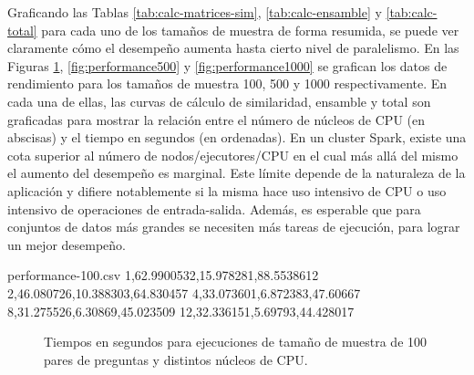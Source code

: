 Graficando las Tablas \ref{tab:calc-matrices-sim}, \ref{tab:calc-ensamble} y \ref{tab:calc-total} para cada uno de los tamaños de muestra de forma resumida, se puede ver claramente cómo el desempeño aumenta hasta cierto nivel de paralelismo. En las Figuras \ref{fig:performance100}, \ref{fig:performance500} y \ref{fig:performance1000} se grafican los datos de rendimiento para los tamaños de muestra 100, 500 y 1000 respectivamente. En cada una de ellas, las curvas de cálculo de similaridad, ensamble y total son graficadas para mostrar la relación entre el número de núcleos de CPU (en abscisas) y el tiempo en segundos (en ordenadas). En un cluster Spark, existe una cota superior al número de nodos/ejecutores/CPU en el cual más allá del mismo el aumento del desempeño es marginal. Este límite depende de la naturaleza de la aplicación y difiere notablemente si la misma hace uso intensivo de CPU o uso intensivo de operaciones de entrada-salida. Además, es esperable que para conjuntos de datos más grandes se necesiten más tareas de ejecución, para lograr un mejor desempeño.

\begin{filecontents*}{performance-100.csv}
1,62.9900532,15.978281,88.5538612
2,46.080726,10.388303,64.830457
4,33.073601,6.872383,47.60667
8,31.275526,6.30869,45.023509
12,32.336151,5.69793,44.428017
\end{filecontents*}

\begin{figure}[h!]
	\centering
	\scriptsize
	\caption{Tiempos en segundos para ejecuciones de tamaño de muestra de 100 pares de preguntas y distintos núcleos de CPU.}
	\label{fig:performance100}
\end{figure}

